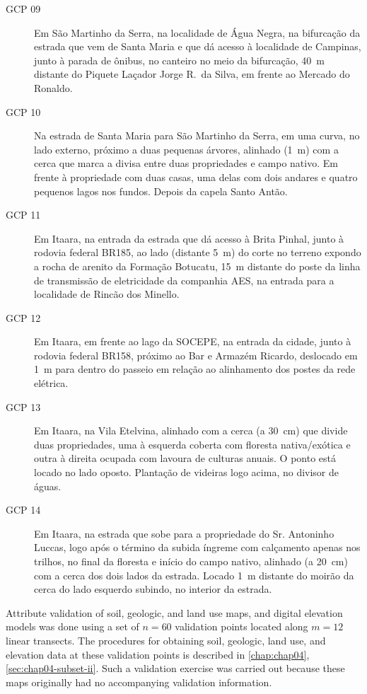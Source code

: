\begin{description}
 \item [GCP 09] Em São Martinho da Serra, na localidade de Água Negra, na bifurcação da estrada que vem de
 Santa Maria e que dá acesso à localidade de Campinas, junto à parada de ônibus, no canteiro no meio da
 bifurcação, \SI{40}{\m} distante do Piquete Laçador Jorge R.~da Silva, em frente ao Mercado do Ronaldo.
 
 \item [GCP 10] Na estrada de Santa Maria para São Martinho da Serra, em uma curva, no lado externo, próximo a
 duas pequenas árvores, alinhado (\SI{1}{\m}) com a cerca que marca a divisa entre duas propriedades e campo
 nativo. Em frente à propriedade com duas casas, uma delas com dois andares e quatro pequenos lagos nos
 fundos. Depois da capela Santo Antão.
 
 \item [GCP 11] Em Itaara, na entrada da estrada que dá acesso à Brita Pinhal, junto à rodovia federal BR185,
 ao lado (distante \SI{5}{\m}) do corte no terreno expondo a rocha de arenito da Formação Botucatu,
 \SI{15}{\m} distante do poste da linha de transmissão de eletricidade da companhia AES, na entrada para a
 localidade de Rincão dos Minello.
 
 \item [GCP 12] Em Itaara, em frente ao lago da SOCEPE, na entrada da cidade, junto à rodovia federal BR158,
 próximo ao Bar e Armazém Ricardo, deslocado em \SI{1}{\m} para dentro do passeio em relação ao alinhamento 
 dos postes da rede elétrica.
 
 \item [GCP 13] Em Itaara, na Vila Etelvina, alinhado com a cerca (a \SI{30}{\cm}) que divide duas 
propriedades, uma à 
 esquerda coberta com floresta nativa/exótica e outra à direita ocupada com lavoura de culturas anuais. O ponto 
está 
 locado no lado oposto. Plantação de videiras logo acima, no divisor de águas.
 
 \item [GCP 14] Em Itaara, na estrada que sobe para a propriedade do Sr. Antoninho Luccas, logo após o término 
 da subida íngreme com calçamento apenas nos trilhos, no final da floresta e início do campo nativo, alinhado 
 (a \SI{20}{\cm}) com a cerca dos dois lados da estrada. Locado \SI{1}{\m} distante do moirão da cerca do 
 lado esquerdo subindo, no interior da estrada.
\end{description}

Attribute validation of soil, geologic, and land use maps, and digital elevation models was done using a set of 
$n = 60$ 
validation points located along $m = 12$ linear transects. The procedures for obtaining soil, geologic, land 
use, and elevation data at these validation points is described in \autoref{chap:chap04}, 
\autoref{sec:chap04-subset-ii}. Such a validation exercise was carried out because these maps originally had no 
accompanying validation information.

